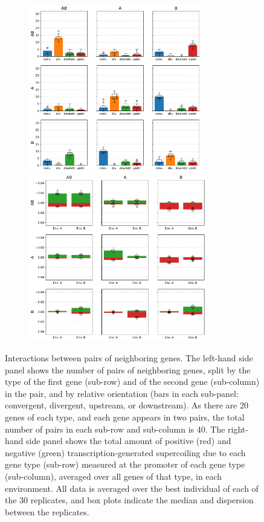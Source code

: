 \begin{figure}[H]
  \centering
  \begin{subfigure}[t]{\textwidth}
    \centering
    \includegraphics[height=7.3cm]{ploscb/img/gene_pair_counts.pdf}
    \includegraphics[height=7.3cm]{ploscb/img/pos_neg_supercoiling_pairs.pdf}
  \end{subfigure}
  \caption{Interactions between pairs of neighboring genes.
  The left-hand side panel shows the number of pairs of neighboring genes, split by the type of the first gene (sub-row) and of the second gene (sub-column) in the pair, and by relative orientation (bars in each sub-panel: convergent, divergent, upstream, or downstream).
  As there are 20 genes of each type, and each gene appears in two pairs, the total number of pairs in each sub-row and sub-column is 40.
  The right-hand side panel shows the total amount of positive (red) and negative (green) transcription-generated supercoiling due to each gene type (sub-row) measured at the promoter of each gene type (sub-column), averaged over all genes of that type, in each environment.
  All data is averaged over the best individual of each of the 30 replicates, and box plots indicate the median and dispersion between the replicates.}
  \label{fig:pair_results}
\end{figure}

